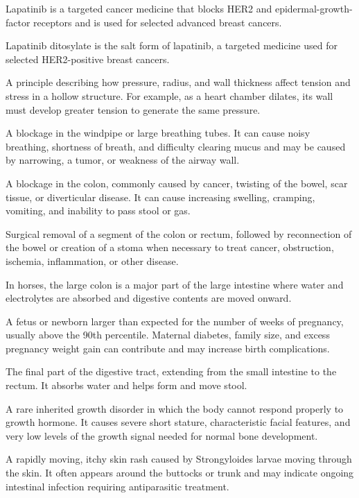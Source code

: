  Lapatinib is a targeted cancer medicine that blocks HER2 and epidermal-growth-factor receptors and is used for selected advanced breast cancers.

 Lapatinib ditosylate is the salt form of lapatinib, a targeted medicine used for selected HER2-positive breast cancers.

 A principle describing how pressure, radius, and wall thickness affect tension and stress in a hollow structure. For example, as a heart chamber dilates, its wall must develop greater tension to generate the same pressure.

 A blockage in the windpipe or large breathing tubes. It can cause noisy breathing, shortness of breath, and difficulty clearing mucus and may be caused by narrowing, a tumor, or weakness of the airway wall.

 A blockage in the colon, commonly caused by cancer, twisting of the bowel, scar tissue, or diverticular disease. It can cause increasing swelling, cramping, vomiting, and inability to pass stool or gas.

 Surgical removal of a segment of the colon or rectum, followed by reconnection of the bowel or creation of a stoma when necessary to treat cancer, obstruction, ischemia, inflammation, or other disease.

 In horses, the large colon is a major part of the large intestine where water and electrolytes are absorbed and digestive contents are moved onward.

 A fetus or newborn larger than expected for the number of weeks of pregnancy, usually above the 90th percentile. Maternal diabetes, family size, and excess pregnancy weight gain can contribute and may increase birth complications.

 The final part of the digestive tract, extending from the small intestine to the rectum. It absorbs water and helps form and move stool.

 A rare inherited growth disorder in which the body cannot respond properly to growth hormone. It causes severe short stature, characteristic facial features, and very low levels of the growth signal needed for normal bone development.

 A rapidly moving, itchy skin rash caused by Strongyloides larvae moving through the skin. It often appears around the buttocks or trunk and may indicate ongoing intestinal infection requiring antiparasitic treatment.


